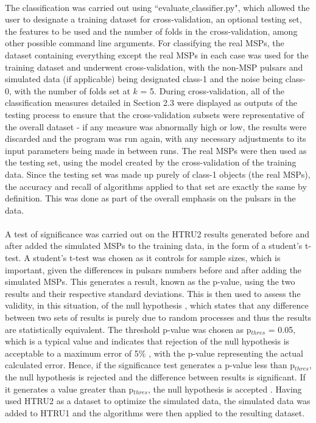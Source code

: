 \documentclass[12pt]{article}
\begin{document}
\paragraph{}
The classification was carried out using ``evaluate$\_$classifier.py", which allowed the user to designate a training dataset for cross-validation, an optional testing set, the features to be used and the number of folds in the cross-validation, among other possible command line arguments. For classifying the real MSPs, the dataset containing everything except the real MSPs in each case was used for the training dataset and underwent cross-validation, with the non-MSP pulsars and simulated data (if applicable) being designated class-1 and the noise being class-0, with the number of folds set at $k$ = 5. During cross-validation, all of the classification measures detailed in Section 2.3 were displayed as outputs of the testing process to ensure that the cross-validation subsets were representative of the overall dataset - if any measure was abnormally high or low, the results were discarded and the program was run again, with any necessary adjustments to its input parameters being made in between runs. The real MSPs were then used as the testing set, using the model created by the cross-validation of the training data. Since the testing set was made up purely of class-1 objects (the real MSPs), the accuracy and recall of algorithms applied to that set are exactly the same by definition. This was done as part of the overall emphasis on the pulsars in the data.
\paragraph{}
A test of significance was carried out on the HTRU2 results generated before and after added the simulated MSPs to the training data, in the form of a student's t-test. A student's t-test was chosen as it controls for sample sizes, which is important, given the differences in pulsars numbers before and after adding the simulated MSPs. This generates a result, known as the p-value, using the two results and their respective standard deviations. This is then used to assess the validity, in this situation, of the null hypothesis \cite{friedman2001elements}, which states that any difference between two sets of results is purely due to random processes and thus the results are statistically equivalent. The threshold p-value was chosen as p$_{thres}$ = 0.05, which is a typical value and indicates that rejection of the null hypothesis is acceptable to a maximum error of 5$\%$ , with the p-value representing the actual calculated error. Hence, if the significance test generates a p-value less than p$_{thres}$, the null hypothesis is rejected and the difference between results is significant. If it generates a value greater than p$_{thres}$, the null hypothesis is accepted \cite{friedman2001elements}. Having used HTRU2 as a dataset to optimize the simulated data, the simulated data was added to HTRU1 and the algorithms were then applied to the resulting dataset.
\end{document}
